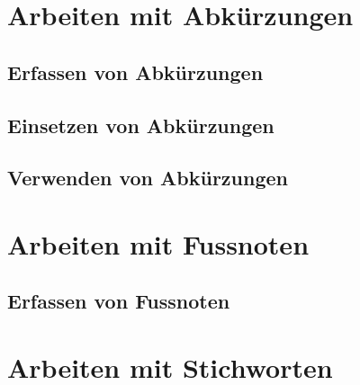 \documentclass[12pt, a4paper, sectionentrydots=true, listof=totoc, listof=entryprefix, numbers=endperiod]{scrartcl}
\begin{document}
\section{Arbeiten mit Abkürzungen}
\begin{spacing}{1.25}

\end{spacing}
%
%
\subsection{Erfassen von Abkürzungen}
\begin{spacing}{1.25}

\end{spacing}
%
%
\subsection{Einsetzen von Abkürzungen}
\begin{spacing}{1.25}

\end{spacing}
%
%
\subsection{Verwenden von Abkürzungen}
\begin{spacing}{1.25}

\end{spacing}
%
%
%
%
%
%
\pagebreak 
\section{Arbeiten mit Fussnoten}
\begin{spacing}{1.25}

\end{spacing}
%
%
\subsection{Erfassen von Fussnoten}
\begin{spacing}{1.25}

\end{spacing}
%
%
%
%
%
%
\pagebreak 
\section{Arbeiten mit Stichworten}
\begin{spacing}{1.25}

\end{spacing}
%
%
\end{document}
